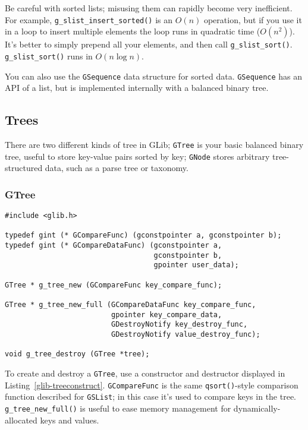 Be careful with sorted lists; misusing them can rapidly become very inefficient. For example, \lstinline{g_slist_insert_sorted()} is an $O(n)$ operation, but if you use it in a loop to insert multiple elements the loop runs in quadratic time ($O(n^2)$). It's better to simply prepend all your elements, and then call \lstinline{g_slist_sort()}. \lstinline{g_slist_sort()} runs in $O(n \log n)$.

You can also use the \lstinline{GSequence} data structure for sorted data. \lstinline{GSequence} has an API of a list, but is implemented internally with a balanced binary tree.

\subsection{Trees}

There are two different kinds of tree in GLib; \lstinline{GTree} is your basic balanced binary tree, useful to store key-value pairs sorted by key; \lstinline{GNode} stores arbitrary tree-structured data, such as a parse tree or taxonomy.

\subsubsection{GTree}

\begin{lstlisting}[float, caption={Creating and destroying balanced binary trees}, label=glib-treeconstruct]
#include <glib.h>

typedef gint (* GCompareFunc) (gconstpointer a, gconstpointer b);
typedef gint (* GCompareDataFunc) (gconstpointer a,
                                   gconstpointer b,
                                   gpointer user_data);

GTree * g_tree_new (GCompareFunc key_compare_func);

GTree * g_tree_new_full (GCompareDataFunc key_compare_func,
                         gpointer key_compare_data,
                         GDestroyNotify key_destroy_func,
                         GDestroyNotify value_destroy_func);

void g_tree_destroy (GTree *tree);
\end{lstlisting}

To create and destroy a \lstinline{GTree}, use a constructor and destructor displayed in Listing~\ref{glib-treeconstruct}. \lstinline{GCompareFunc} is the same \lstinline{qsort()}-style comparison function described for \lstinline{GSList}; in this case it's used to compare keys in the tree. \lstinline{g_tree_new_full()} is useful to ease memory management for dynamically-allocated keys and values.

